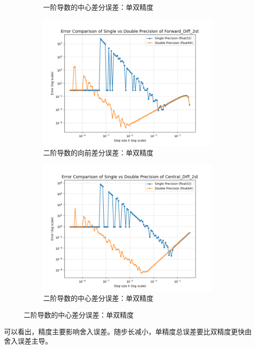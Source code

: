 \documentclass[12pt, a4paper]{article}
\begin{document}
\begin{figure}[htbp]
\begin{subfigure}[b]{0.45\textwidth}
        \caption{一阶导数的中心差分误差：单双精度}
        \label{fig: ECC1}
    \end{subfigure}
    \vspace{0.5cm}
    \centering
    \begin{subfigure}[b]{0.45\textwidth} 
        \centering
        \includegraphics[width=\textwidth]{./pictures/Error Comparison of Single vs Double Precision of Forward_Diff_2st.png} 
        \caption{二阶导数的向前差分误差：单双精度}
        \label{fig: ECF2}
    \end{subfigure}
    \hfill
    \begin{subfigure}[b]{0.45\textwidth} 
        \centering
        \includegraphics[width=\textwidth]{./pictures/Error Comparison of Single vs Double Precision of Central_Diff_2st.png} 
        \caption{二阶导数的中心差分误差：单双精度}
        \label{fig: ECC2}
    \end{subfigure}
\end{figure}

可以看出，精度主要影响舍入误差。随步长减小，单精度总误差要比双精度更快由舍入误差主导。
\end{document}
